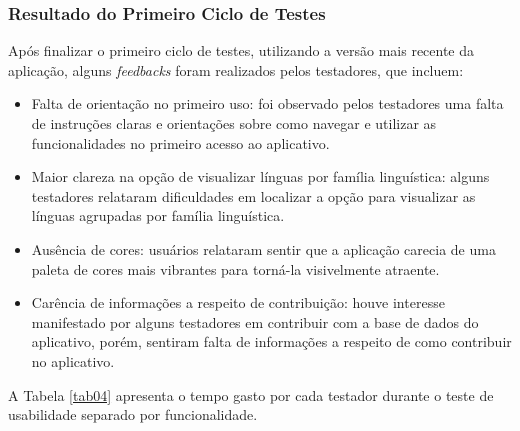 \subsubsection{Resultado do Primeiro Ciclo de Testes}
\label{sec:Resultado do Primeiro Ciclo de Testes}
Após finalizar o primeiro ciclo de testes, utilizando a versão mais recente da aplicação, alguns \textit{feedbacks} foram realizados pelos testadores, que incluem:

\begin{itemize}
	\item Falta de orientação no primeiro uso: foi observado pelos testadores uma falta de instruções claras e orientações sobre como navegar e utilizar as funcionalidades no primeiro acesso ao aplicativo.
	\item Maior clareza na opção de visualizar línguas por família linguística: alguns testadores relataram dificuldades em localizar a opção para visualizar as línguas agrupadas por família linguística.
	\item Ausência de cores: usuários relataram sentir que a aplicação carecia de uma paleta de cores mais vibrantes para torná-la visivelmente atraente.
	\item Carência de informações a respeito de contribuição: houve interesse manifestado por alguns testadores em contribuir com a base de dados do aplicativo, porém, sentiram falta de informações a respeito 
	de como contribuir no aplicativo.
\end{itemize}

A Tabela \ref{tab04} apresenta o tempo gasto por cada testador durante o teste de usabilidade separado por funcionalidade.

